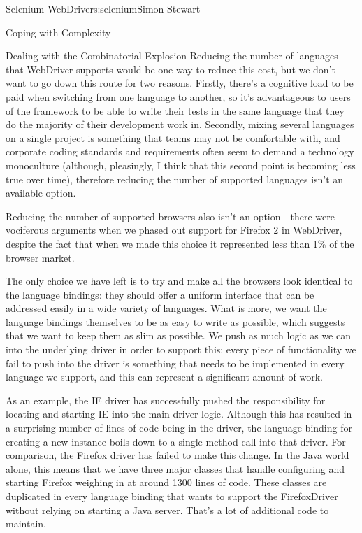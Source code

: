 \begin{aosachapter}{Selenium WebDriver}{s:selenium}{Simon Stewart}
\begin{aosasect1}{Coping with Complexity}
\begin{aosasect2}{Dealing with the Combinatorial Explosion}
Reducing the number of languages that WebDriver supports would be one
way to reduce this cost, but we don't want to go down this route for
two reasons. Firstly, there's a cognitive load to be paid when
switching from one language to another, so it's advantageous to users
of the framework to be able to write their tests in the same language
that they do the majority of their development work in. Secondly,
mixing several languages on a single project is something that teams
may not be comfortable with, and corporate coding standards and
requirements often seem to demand a technology monoculture (although,
pleasingly, I think that this second point is becoming less true over
time), therefore reducing the number of supported languages isn't an
available option.

Reducing the number of supported browsers also isn't an option---there
were vociferous arguments when we phased out support for Firefox 2 in
WebDriver, despite the fact that when we made this choice it
represented less than 1\% of the browser market.

The only choice we have left is to try and make all the browsers look
identical to the language bindings: they should offer a uniform
interface that can be addressed easily in a wide variety of languages.
What is more, we want the language bindings themselves to be as easy
to write as possible, which suggests that we want to keep them as slim
as possible. We push as much logic as we can into the underlying
driver in order to support this: every piece of functionality we fail
to push into the driver is something that needs to be implemented in
every language we support, and this can represent a significant amount
of work.

As an example, the IE driver has successfully pushed the
responsibility for locating and starting IE into the main driver
logic. Although this has resulted in a surprising number of lines of
code being in the driver, the language binding for creating a new
instance boils down to a single method call into that driver. For
comparison, the Firefox driver has failed to make this change. In the
Java world alone, this means that we have three major classes that
handle configuring and starting Firefox weighing in at around 1300
lines of code. These classes are duplicated in every language binding
that wants to support the FirefoxDriver without relying on starting a
Java server. That's a lot of additional code to maintain.

\end{aosasect2}


\end{aosasect1}
\end{aosachapter}
